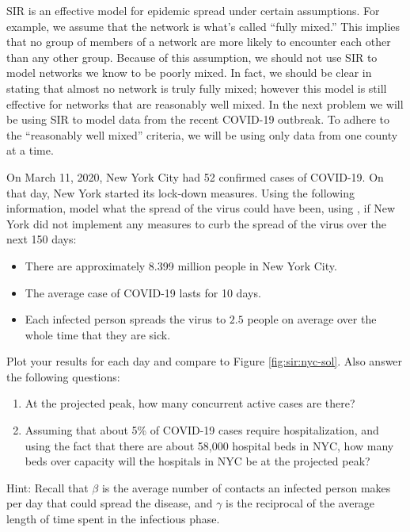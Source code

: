 SIR is an effective model for epidemic spread under certain assumptions.
For example, we assume that the network is what's called ``fully mixed.''
This implies that no group of members of a network are more likely to encounter each other than any other group.
Because of this assumption, we should not use SIR to model networks we know to be poorly mixed.
In fact, we should be clear in stating that almost no network is truly fully mixed; however this model is still effective for networks that are reasonably well mixed.
In the next problem we will be using SIR to model data from the recent COVID-19 outbreak.
To adhere to the ``reasonably well mixed'' criteria, we will be using only data from one county at a time.

\begin{problem}
\label{prob:sir:nyc}
On March 11, 2020, New York City had 52 confirmed cases of COVID-19.
On that day, New York started its lock-down measures.
Using the following information, model what the spread of the virus could have been, using , if New York did not implement any measures to curb the spread of the virus over the next 150 days:

\begin{itemize}
    \item There are approximately 8.399 million people in New York City.
    \item The average case of COVID-19 lasts for 10 days.
    \item Each infected person spreads the virus to $2.5$ people on average over the whole time that they are sick.
\end{itemize}

Plot your results for each day and compare to Figure \ref{fig:sir:nyc-sol}.
Also answer the following questions:
\begin{enumerate}
\item At the projected peak, how many concurrent active cases are there?
\item Assuming that about 5\% of COVID-19 cases require hospitalization, and using the fact that there are about 58,000 hospital beds in NYC, how many beds over capacity will the hospitals in NYC be at the projected peak?
\end{enumerate}

Hint: Recall that $\beta$ is the average number of contacts an infected person makes per day that could spread the disease, and $\gamma$ is the reciprocal of the average length of time spent in the infectious phase.
\end{problem}


